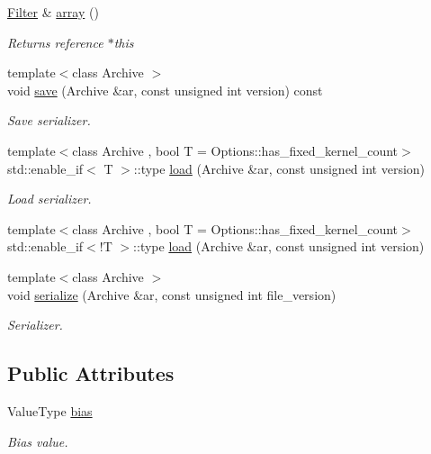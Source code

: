 \begin{DoxyCompactItemize}
\hyperlink{structffnn_1_1layer_1_1convolution_1_1_filter}{Filter} \& \hyperlink{structffnn_1_1layer_1_1convolution_1_1_filter_a67b153ce5dd863e99bd3ba811e557cce}{array} ()
\begin{DoxyCompactList}\small\item\em Returns reference {\ttfamily $\ast$this} \end{DoxyCompactList}\item 
{\footnotesize template$<$class Archive $>$ }\\void \hyperlink{structffnn_1_1layer_1_1convolution_1_1_filter_a339b11d21993373dc8ba26cc14c7d1fc}{save} (Archive \&ar, const unsigned int version) const 
\begin{DoxyCompactList}\small\item\em Save serializer. \end{DoxyCompactList}\item 
{\footnotesize template$<$class Archive , bool T = Options\-::has\-\_\-fixed\-\_\-kernel\-\_\-count$>$ }\\std\-::enable\-\_\-if$<$ T $>$\-::type \hyperlink{structffnn_1_1layer_1_1convolution_1_1_filter_a2526fa5d145e32ca98c600d6114d75da}{load} (Archive \&ar, const unsigned int version)
\begin{DoxyCompactList}\small\item\em Load serializer. \end{DoxyCompactList}\item 
{\footnotesize template$<$class Archive , bool T = Options\-::has\-\_\-fixed\-\_\-kernel\-\_\-count$>$ }\\std\-::enable\-\_\-if$<$!T $>$\-::type \hyperlink{structffnn_1_1layer_1_1convolution_1_1_filter_a53db087b4da6ead13ddefaf0bab7d726}{load} (Archive \&ar, const unsigned int version)
\item 
{\footnotesize template$<$class Archive $>$ }\\void \hyperlink{structffnn_1_1layer_1_1convolution_1_1_filter_a9fd6c03040f1f074eb35092071da0570}{serialize} (Archive \&ar, const unsigned int file\-\_\-version)
\begin{DoxyCompactList}\small\item\em Serializer. \end{DoxyCompactList}\end{DoxyCompactItemize}
\subsection*{Public Attributes}
\begin{DoxyCompactItemize}
\item 
Value\-Type \hyperlink{structffnn_1_1layer_1_1convolution_1_1_filter_a3638f1ebfd8d5d4469392dd7b2470cc3}{bias}
\begin{DoxyCompactList}\small\item\em Bias value. \end{DoxyCompactList}\end{DoxyCompactItemize}


